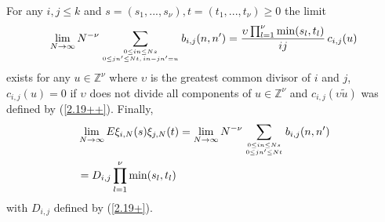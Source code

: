 \begin{proposition}\label{prop4.4} For any $i,j\leq k$ and $s=(s_1,...,s_\nu),
t=(t_1,...,t_\nu)\geq 0$ the limit
\begin{equation}\label{4.11}
\lim_{N\to\infty}N^{-\nu}\sum_{0\le in \le Ns\atop 0\le jn' \le Nt,\,
in-jn'= u} b_{i,j}(n,n')=\frac {{{\upsilon}}\prod_{l=1}^\nu\min(s_l,t_l)}{ij}\,c_{i,j}(u)
\end{equation}
exists for any $u\in{{\mathbb Z}}^\nu$ where ${{\upsilon}}$ is the greatest common divisor of $i$
and $j$, $c_{i,j}(u)=0$ if ${{\upsilon}}$ does not divide all components of $u\in{{\mathbb Z}}^\nu$
and $c_{i,j}({{\upsilon}}\tilde u)$ was defined by (\ref{2.19++}). Finally,
\begin{eqnarray}\label{4.13}
&\lim_{N\to\infty}E\xi_{i,N}(s)\xi_{j,N}(t)=
\lim_{N\to\infty}N^{-\nu}\sum_{0\le in\le Ns\atop 0\le jn'\le Nt}
b_{i,j}(n,n')\\
&=D_{i,j}\prod_{l=1}^\nu\min(s_l,t_l)\nonumber
\end{eqnarray}
with $D_{i,j}$ defined by (\ref{2.19+}).
\end{proposition}
